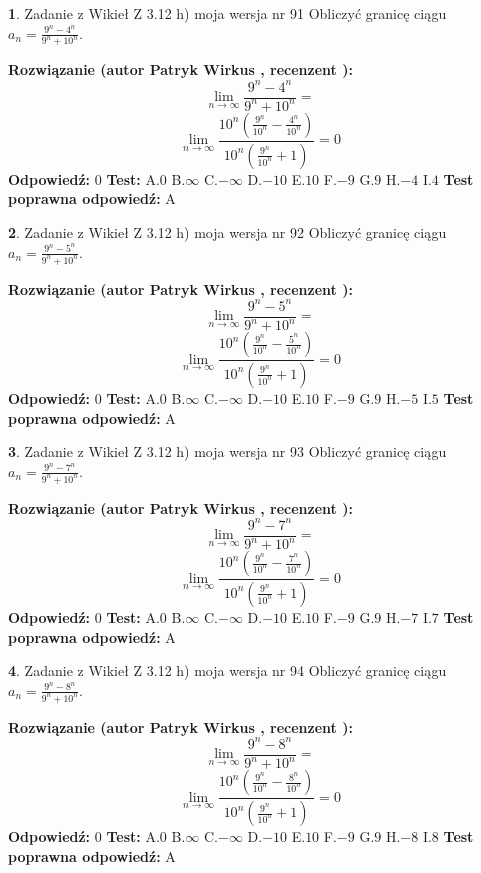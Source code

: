 \documentclass[12pt, a4paper]{article}
\theoremstyle{definition} %
\newtheorem{zad}{}
\newcommand{\zadStart}[1]{\begin{zad}#1\newline}
\newcommand{\zadStop}{\end{zad}}
\newcommand{\rozwStart}[2]{\noindent \textbf{Rozwiązanie (autor #1 , recenzent #2): }\newline}
\newcommand{\rozwStop}{\newline}
\newcommand{\odpStart}{\noindent \textbf{Odpowiedź:}\newline}
\newcommand{\odpStop}{\newline}
\newcommand{\testStart}{\noindent \textbf{Test:}\newline}
\newcommand{\testStop}{\newline}
\newcommand{\kluczStart}{\noindent \textbf{Test poprawna odpowiedź:}\newline}
\newcommand{\kluczStop}{\newline}
\begin{document}
\zadStart{Zadanie z Wikieł Z 3.12 h) moja wersja nr 91}
Obliczyć granicę ciągu $a_{n}=\frac{9^{n} - 4^{n}}{9^{n} + 10^{n}}$.
\zadStop
\rozwStart{Patryk Wirkus}{}
$$\lim\limits_{n\to\infty}\frac{9^{n} - 4^{n}}{9^{n} + 10^{n}}=$$
$$\lim\limits_{n\to\infty}\frac{10^{n}(\frac{9^{n}}{10^{n}} - \frac{4^{n}}{10^{n}})}{10^{n}(\frac{9^{n}}{10^{n}} + 1)} = 0$$
\rozwStop
\odpStart
$0$
\odpStop
\testStart
A.$0$
B.$\infty$
C.$-\infty$
D.$-10$
E.$10$
F.$-9$
G.$9$
H.$-4$
I.$4$
\testStop
\kluczStart
A
\kluczStop



\zadStart{Zadanie z Wikieł Z 3.12 h) moja wersja nr 92}
Obliczyć granicę ciągu $a_{n}=\frac{9^{n} - 5^{n}}{9^{n} + 10^{n}}$.
\zadStop
\rozwStart{Patryk Wirkus}{}
$$\lim\limits_{n\to\infty}\frac{9^{n} - 5^{n}}{9^{n} + 10^{n}}=$$
$$\lim\limits_{n\to\infty}\frac{10^{n}(\frac{9^{n}}{10^{n}} - \frac{5^{n}}{10^{n}})}{10^{n}(\frac{9^{n}}{10^{n}} + 1)} = 0$$
\rozwStop
\odpStart
$0$
\odpStop
\testStart
A.$0$
B.$\infty$
C.$-\infty$
D.$-10$
E.$10$
F.$-9$
G.$9$
H.$-5$
I.$5$
\testStop
\kluczStart
A
\kluczStop



\zadStart{Zadanie z Wikieł Z 3.12 h) moja wersja nr 93}
Obliczyć granicę ciągu $a_{n}=\frac{9^{n} - 7^{n}}{9^{n} + 10^{n}}$.
\zadStop
\rozwStart{Patryk Wirkus}{}
$$\lim\limits_{n\to\infty}\frac{9^{n} - 7^{n}}{9^{n} + 10^{n}}=$$
$$\lim\limits_{n\to\infty}\frac{10^{n}(\frac{9^{n}}{10^{n}} - \frac{7^{n}}{10^{n}})}{10^{n}(\frac{9^{n}}{10^{n}} + 1)} = 0$$
\rozwStop
\odpStart
$0$
\odpStop
\testStart
A.$0$
B.$\infty$
C.$-\infty$
D.$-10$
E.$10$
F.$-9$
G.$9$
H.$-7$
I.$7$
\testStop
\kluczStart
A
\kluczStop



\zadStart{Zadanie z Wikieł Z 3.12 h) moja wersja nr 94}
Obliczyć granicę ciągu $a_{n}=\frac{9^{n} - 8^{n}}{9^{n} + 10^{n}}$.
\zadStop
\rozwStart{Patryk Wirkus}{}
$$\lim\limits_{n\to\infty}\frac{9^{n} - 8^{n}}{9^{n} + 10^{n}}=$$
$$\lim\limits_{n\to\infty}\frac{10^{n}(\frac{9^{n}}{10^{n}} - \frac{8^{n}}{10^{n}})}{10^{n}(\frac{9^{n}}{10^{n}} + 1)} = 0$$
\rozwStop
\odpStart
$0$
\odpStop
\testStart
A.$0$
B.$\infty$
C.$-\infty$
D.$-10$
E.$10$
F.$-9$
G.$9$
H.$-8$
I.$8$
\testStop
\kluczStart
A
\kluczStop
\end{document}
